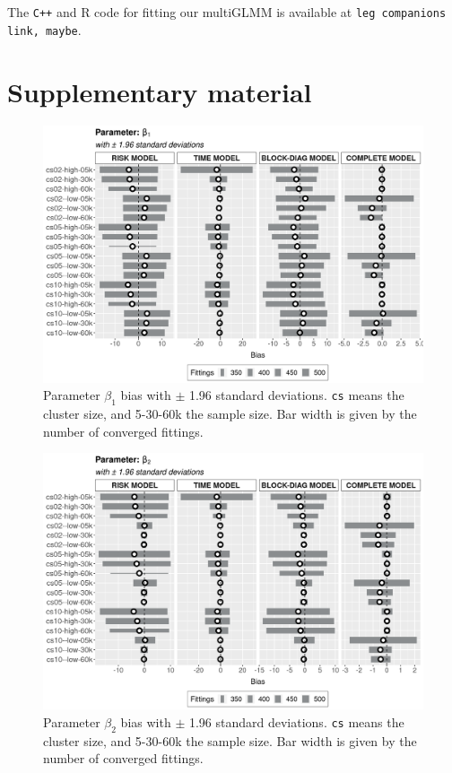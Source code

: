 \documentclass[a4paper,12pt]{article}
\begin{document}
The \texttt{C++} and R code for fitting our multiGLMM is available at
\texttt{leg companions link, maybe}.

\section*{Supplementary material}

\vspace{-0.39cm}
\begin{figure}[H]
 \centering
 \includegraphics[width=\linewidth]{pics/bias2plotsd-1.png}
 \vspace{-0.75cm}
 \caption{Parameter \(\beta_{1}\) bias with \(\pm\) 1.96 standard
   deviations. \texttt{cs} means the cluster size, and 5-30-60k the
   sample size. Bar width is given by the number of converged fittings.}
 \label{fig:biassdbeta1}
\end{figure}

\begin{figure}[H]
 \centering
 \includegraphics[width=\linewidth]{pics/bias2plotsd-2.png}
 \vspace{-0.75cm}
 \caption{Parameter \(\beta_{2}\) bias with \(\pm\) 1.96 standard
   deviations. \texttt{cs} means the cluster size, and 5-30-60k the
   sample size. Bar width is given by the number of converged fittings.}
 \label{fig:biassdbeta2}
\end{figure}
\end{document}
